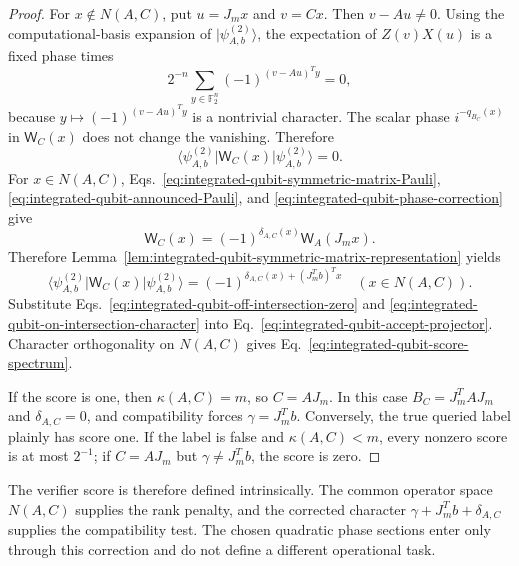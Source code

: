 \documentclass[11pt]{article}
\newcommand{\F}{\mathbb F}
\newcommand{\1}{\mathbf 1}
\newcommand{\ket}[1]{\lvert #1\rangle}
\newcommand{\bra}[1]{\langle #1\rvert}
\theoremstyle{plain}
\theoremstyle{definition}
\theoremstyle{remark}
\begin{document}
\begin{proof}
For $x\notin N(A,C)$, put $u=J_mx$ and $v=Cx$.  Then $v-Au\ne0$.
Using the computational-basis expansion of
$\ket{\psi_{A,b}^{(2)}}$, the expectation of $Z(v)X(u)$ is a fixed phase
times
\begin{equation}
 2^{-n}\sum_{y\in\F_2^n}(-1)^{(v-Au)^Ty}=0,
 \label{eq:integrated-qubit-off-intersection-character-sum}
\end{equation}
because $y\mapsto(-1)^{(v-Au)^Ty}$ is a nontrivial character.  The scalar
phase $i^{-q_{B_C}(x)}$ in $\mathsf W_C(x)$ does not change the vanishing.
Therefore
\begin{equation}
 \bra{\psi_{A,b}^{(2)}}\mathsf W_C(x)
 \ket{\psi_{A,b}^{(2)}}=0.
 \label{eq:integrated-qubit-off-intersection-zero}
\end{equation}
For $x\in N(A,C)$, Eqs.~\eqref{eq:integrated-qubit-symmetric-matrix-Pauli},
\eqref{eq:integrated-qubit-announced-Pauli}, and
\eqref{eq:integrated-qubit-phase-correction} give
\begin{equation}
 \mathsf W_C(x)
 =(-1)^{\delta_{A,C}(x)}\mathsf W_A(J_mx).
 \label{eq:integrated-qubit-section-comparison}
\end{equation}
Therefore Lemma~\ref{lem:integrated-qubit-symmetric-matrix-representation} yields
\begin{equation}
 \bra{\psi_{A,b}^{(2)}}\mathsf W_C(x)
 \ket{\psi_{A,b}^{(2)}}
 =(-1)^{\delta_{A,C}(x)+(J_m^Tb)^Tx}
 \quad(x\in N(A,C)).
 \label{eq:integrated-qubit-on-intersection-character}
\end{equation}
Substitute Eqs.~\eqref{eq:integrated-qubit-off-intersection-zero} and
\eqref{eq:integrated-qubit-on-intersection-character} into
Eq.~\eqref{eq:integrated-qubit-accept-projector}.  Character orthogonality on
$N(A,C)$ gives Eq.~\eqref{eq:integrated-qubit-score-spectrum}.

If the score is one, then $\kappa(A,C)=m$, so $C=AJ_m$.  In this case
$B_C=J_m^TAJ_m$ and $\delta_{A,C}=0$, and compatibility forces
$\gamma=J_m^Tb$.  Conversely, the true queried label plainly has score one.
If the label is false and $\kappa(A,C)<m$, every nonzero score is at most
$2^{-1}$; if $C=AJ_m$ but $\gamma\ne J_m^Tb$, the score is zero.
\end{proof}

The verifier score is therefore defined intrinsically.  The common operator
space $N(A,C)$ supplies the rank penalty, and the corrected character
$\gamma+J_m^Tb+\delta_{A,C}$ supplies the compatibility test.  The chosen
quadratic phase sections enter only through this correction and do not define
a different operational task.
\end{document}
